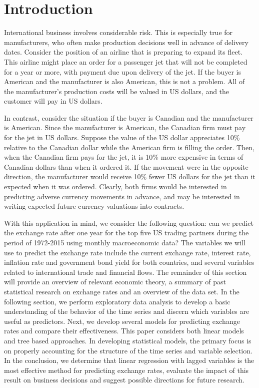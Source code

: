 \documentclass{sig-alternate-05-2015}
\begin{document}
\section{Introduction}
International business involves considerable risk. This is especially true for manufacturers, who often make production decisions well in advance of delivery dates. Consider the position of an airline that is preparing to expand its fleet. This airline might place an order for a passenger jet that will not be completed for a year or more, with payment due upon delivery of the jet. If the buyer is American and the manufacturer is also American, this is not a problem. All of the manufacturer's production costs will be valued in US dollars, and the customer will pay in US dollars.
\par{} In contrast, consider the situation if the buyer is Canadian and the manufacturer is American. Since the manufacturer is American, the Canadian firm must pay for the jet in US dollars. Suppose the value of the US dollar appreciates 10\% relative to the Canadian dollar while the American firm is filling the order. Then, when the Canadian firm pays for the jet, it is 10\% more expensive in terms of Canadian dollars than when it ordered it. If the movement were in the opposite direction, the manufacturer would receive 10\% fewer US dollars for the jet than it expected when it was ordered. Clearly, both firms would be interested in predicting adverse currency movements in advance, and may be interested in writing expected future currency valuations into contracts. 
\par{} With this application in mind, we consider the following question: can we predict the exchange rate after one year for the top five US trading partners during the period of 1972-2015 using monthly macroeconomic data? The variables we will use to predict the exchange rate include the current exchange rate, interest rate, inflation rate and government bond yield for both countries, and several variables related to international trade and financial flows. The remainder of this section will provide an overview of relevant economic theory, a summary of past statistical research on exchange rates and an overview of the data set. In the following section, we perform exploratory data analysis to develop a basic understanding of the behavior of the time series and discern which variables are useful as predictors. Next, we develop several models for predicting exchange rates and compare their effectiveness. This paper considers both linear models and tree based approaches. In developing statistical models, the primary focus is on properly accounting for the structure of the time series and variable selection. In the conclusion, we determine that linear regression with lagged variables is the most effective method for predicting exchange rates, evaluate the impact of this result on business decisions and suggest possible directions for future research.
\end{document}
